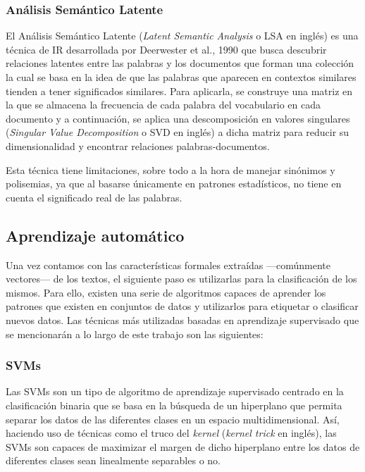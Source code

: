 \subsubsection{Análisis Semántico Latente}
\label{sec:analisis_semantico_latente}

El Análisis Semántico Latente (\textit{Latent Semantic Analysis} o LSA en inglés) es una técnica de IR desarrollada por Deerwester et al., 1990 \cite{deerwester1990indexing}
que busca descubrir relaciones latentes
entre las palabras y los documentos que forman una colección la cual se basa
en la idea de que las palabras que aparecen en contextos similares
tienden a tener significados similares. Para aplicarla, se construye una matriz en la que se almacena la frecuencia de cada palabra del vocabulario en cada documento y
a continuación, se aplica una descomposición en valores singulares (\textit{Singular Value Decomposition} o SVD en inglés) a dicha matriz para reducir su dimensionalidad
y encontrar relaciones palabras-documentos.

\bigskip
Esta técnica tiene limitaciones, sobre todo a la hora de manejar sinónimos y polisemias, ya que al basarse únicamente en patrones estadísticos,
no tiene en cuenta el significado real de las palabras.

\subsection{Aprendizaje automático}
\label{sec:aprendizaje_automatico}

Una vez contamos con las características formales extraídas —comúnmente vectores— de los textos, el siguiente paso es utilizarlas para la clasificación de los mismos.
Para ello, existen una serie de algoritmos capaces de aprender los patrones que existen en conjuntos de datos y utilizarlos para
etiquetar o clasificar nuevos datos. Las técnicas más utilizadas basadas en aprendizaje supervisado que se mencionarán a lo largo de este trabajo son las siguientes:

\subsubsection{SVMs}
\label{sec:svm}

Las SVMs son un tipo de algoritmo de aprendizaje supervisado centrado en la clasificación binaria que se basa en la búsqueda de un hiperplano
que permita separar los datos de las diferentes clases en un espacio multidimensional. Así, haciendo uso de técnicas como el truco del \textit{kernel}
(\textit{kernel trick} en inglés), las SVMs son capaces de maximizar el margen de dicho hiperplano entre los datos de diferentes clases sean linealmente separables o no.

